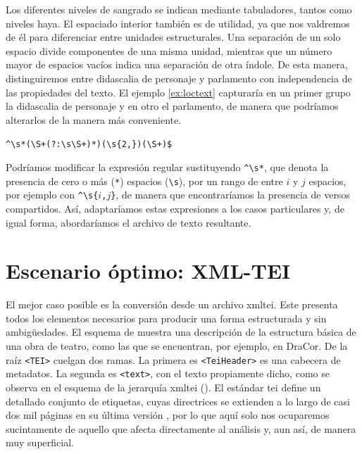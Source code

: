 Los diferentes niveles de sangrado se indican mediante tabuladores, tantos como niveles haya. El espaciado interior también es de utilidad, ya que nos valdremos de él para diferenciar entre unidades estructurales. Una separación de un solo espacio divide componentes de una misma unidad, mientras que un número mayor de espacios vacíos indica una separación de otra índole. De esta manera, distinguiremos entre didascalia de personaje y parlamento con independencia de las propiedades del texto. El ejemplo \ref{ex:loctext} capturaría en un primer grupo la didascalia de personaje y en otro el parlamento, de manera que podríamos alterarlos de la manera más conveniente.

\begin{exe}
	\ex\label{ex:loctext}\texttt{\^{}\textbackslash s*(\textbackslash S+(?:\textbackslash s\textbackslash S+)*)(\textbackslash s\{2,\})(\textbackslash S+)\$}
\end{exe}

Podríamos modificar la expresión regular sustituyendo \texttt{\^{}\textbackslash s*}, que denota la presencia de cero o más (\texttt{*}) espacios (\texttt{\textbackslash s}), por un rango de entre $i$ y $j$ espacios, por ejemplo con \texttt{\^{}\textbackslash s\{$i$,$j$\}}, de manera que encontraríamos la presencia de versos compartidos. Así, adaptaríamos estas expresiones a los casos particulares y, de igual forma, abordaríamos el archivo de texto resultante.

\section{Escenario óptimo: XML-TEI}
El mejor caso posible es la conversión desde un archivo \ac{xmltei}. Este presenta todos los elementos necesarios para producir una forma estructurada y sin ambigüedades. El esquema de  muestra una descripción de la estructura básica de una obra de teatro, como las que se encuentran, por ejemplo, en DraCor. De la raíz \texttt{<TEI>} cuelgan dos ramas. La primera es \texttt{<TeiHeader>} es una cabecera de metadatos. La segunda es \texttt{<text>}, con el texto propiamente dicho, como se observa en el esquema de la jerarquía \ac{xmltei} (). El estándar \ac{tei} define un detallado conjunto de etiquetas, cuyas directrices se extienden a lo largo de casi dos mil páginas en su última versión \parencite{tei2022}, por lo que aquí solo nos ocuparemos sucintamente de aquello que afecta directamente al análisis y, aun así, de manera muy superficial.
	
